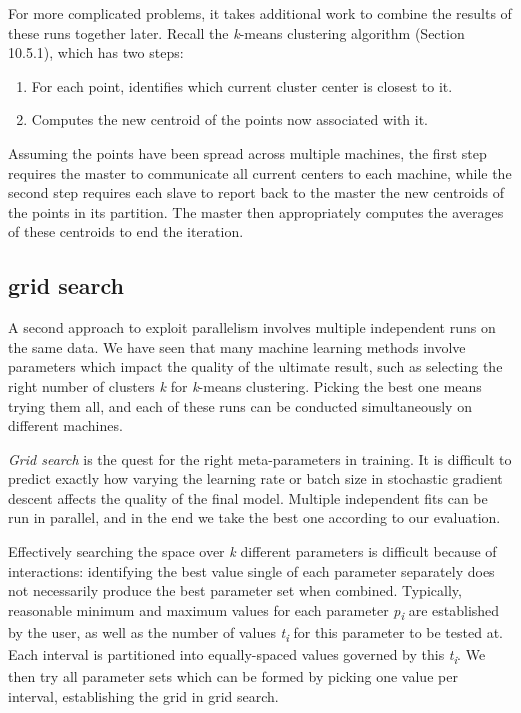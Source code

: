 \documentclass[10pt]{article}
\begin{document}
\begin{enumerate}
For more complicated problems, it takes additional work to combine the results of these runs together later. Recall the \textit{k}-means clustering algorithm (Section 10.5.1), which has two steps:

\begin{enumerate}
  \item For each point, identifies which current cluster center is closest to it.
  \item Computes the new centroid of the points now associated with it.
\end{enumerate}

Assuming the points have been spread across multiple machines, the first step requires the master to communicate all current centers to each machine, while the second step requires each slave to report back to the master the new centroids of the points in its partition. The master then appropriately computes the averages of these centroids to end the iteration.

\subsection*{grid search}
A second approach to exploit parallelism involves multiple independent runs on the same data. We have seen that many machine learning methods involve parameters which impact the quality of the ultimate result, such as selecting the right number of clusters \textit{k} for \textit{k}-means clustering. Picking the best one means trying them all, and each of these runs can be conducted simultaneously on different machines.

\textit{Grid search} is the quest for the right meta-parameters in training. It is difficult to predict exactly how varying the learning rate or batch size in stochastic gradient descent affects the quality of the final model. Multiple independent fits can be run in parallel, and in the end we take the best one according to our evaluation.

Effectively searching the space over \textit{k} different parameters is difficult because of interactions: identifying the best value single of each parameter separately does not necessarily produce the best parameter set when combined. Typically, reasonable minimum and maximum values for each parameter \textit{p\textsubscript{i}} are established by the user, as well as the number of values \textit{t\textsubscript{i}} for this parameter to be tested at. Each interval is partitioned into equally-spaced values governed by this \textit{t\textsubscript{i}}. We then try all parameter sets which can be formed by picking one value per interval, establishing the grid in grid search.


\end{enumerate}
\end{document}
